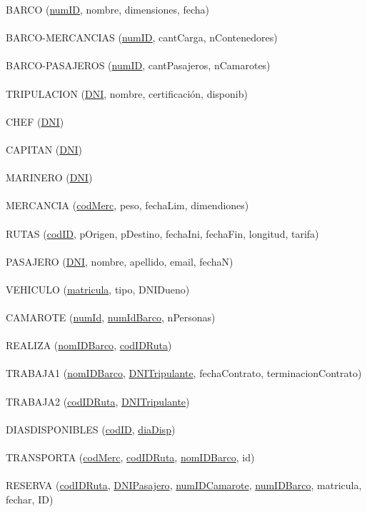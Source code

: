 \documentclass{article}
\begin{document}
BARCO (\underline{numID}, nombre, dimensiones, fecha)\\\\
BARCO-MERCANCIAS (\underline{numID}, cantCarga, nContenedores)\\\\
BARCO-PASAJEROS (\underline{numID}, cantPasajeros, nCamarotes)\\\\
TRIPULACION (\underline{DNI}, nombre, certificación, disponib)\\\\
CHEF (\underline{DNI})\\\\
CAPITAN (\underline{DNI})\\\\
MARINERO (\underline{DNI})\\\\
MERCANCIA (\underline{codMerc}, peso, fechaLim, dimendiones)\\\\
RUTAS (\underline{codID}, pOrigen, pDestino, fechaIni, fechaFin, longitud, tarifa)\\\\
PASAJERO (\underline{DNI}, nombre, apellido, email, fechaN)\\\\
VEHICULO (\underline{matricula}, tipo, DNIDueno)\\\\
CAMAROTE (\underline{numId}, \underline{numIdBarco}, nPersonas)\\\\
REALIZA (\underline{nomIDBarco}, \underline{codIDRuta})\\\\
TRABAJA1 (\underline{nomIDBarco}, \underline{DNITripulante}, fechaContrato, terminacionContrato)\\\\
TRABAJA2 (\underline{codIDRuta}, \underline{DNITripulante})\\\\
DIASDISPONIBLES (\underline{codID}, \underline{diaDisp})\\\\
TRANSPORTA (\underline{codMerc}, \underline{codIDRuta}, \underline{nomIDBarco}, id)\\\\
RESERVA (\underline{codIDRuta}, \underline{DNIPasajero}, \underline{numIDCamarote}, \underline{numIDBarco}, matricula, fechar, ID)\\\\
\end{document}
